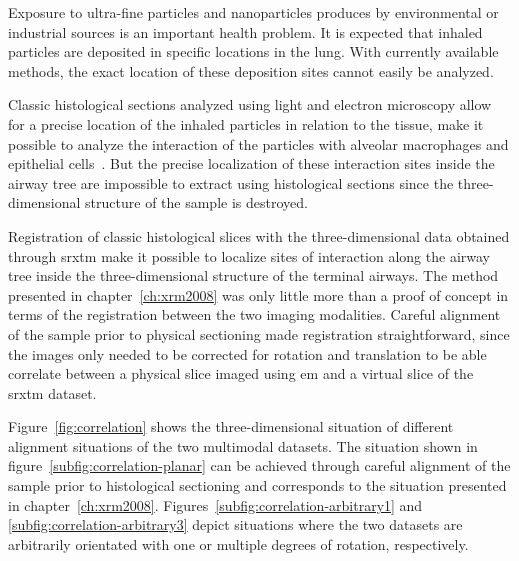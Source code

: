 Exposure to ultra-fine particles and nanoparticles produces by environmental or industrial sources is an important health problem. It is expected that inhaled particles are deposited in specific locations in the lung. With currently available methods, the exact location of these deposition sites cannot easily be analyzed. 

Classic histological sections analyzed using light and electron microscopy allow for a precise location of the inhaled particles in relation to the tissue, \ie make it possible to analyze the interaction of the particles with alveolar macrophages and epithelial cells~\cite{Muhlfeld2008}. But the precise localization of these interaction sites inside the airway tree are impossible to extract using histological sections since the three-dimensional structure of the sample is destroyed.

Registration of classic histological slices with the three-dimensional data obtained through \ac{srxtm} make it possible to localize sites of interaction along the airway tree inside the three-dimensional structure of the terminal airways. The method presented in chapter~\ref{ch:xrm2008} was only little more than a proof of concept in terms of the registration between the two imaging modalities. Careful alignment of the sample prior to physical sectioning made registration straightforward, since the images only needed to be corrected for rotation and translation to be able correlate between a physical slice imaged using \ac{em} and a virtual slice of the \ac{srxtm} dataset.

Figure~\ref{fig:correlation} shows the three-dimensional situation of different alignment situations of the two multimodal datasets. The situation shown in figure~\ref{subfig:correlation-planar} can be achieved through careful alignment of the sample prior to histological sectioning and corresponds to the situation presented in chapter~\ref{ch:xrm2008}. Figures~\ref{subfig:correlation-arbitrary1} and \ref{subfig:correlation-arbitrary3} depict situations where the two datasets are arbitrarily orientated with one or multiple degrees of rotation, respectively.

